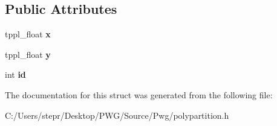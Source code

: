 \subsection*{Public Attributes}
\begin{DoxyCompactItemize}
\item 
\mbox{\label{struct_t_p_p_l_point_a718b1351c71cc8d2b0af5f386bfca00f}} 
tppl\+\_\+float {\bfseries x}
\item 
\mbox{\label{struct_t_p_p_l_point_a21ff0a730bc725fd09dfcb190df19702}} 
tppl\+\_\+float {\bfseries y}
\item 
\mbox{\label{struct_t_p_p_l_point_a53faa8b23bbdf082a39cefb6843d1b7e}} 
int {\bfseries id}
\end{DoxyCompactItemize}


The documentation for this struct was generated from the following file\+:\begin{DoxyCompactItemize}
\item 
C\+:/\+Users/stepr/\+Desktop/\+P\+W\+G/\+Source/\+Pwg/polypartition.\+h\end{DoxyCompactItemize}
